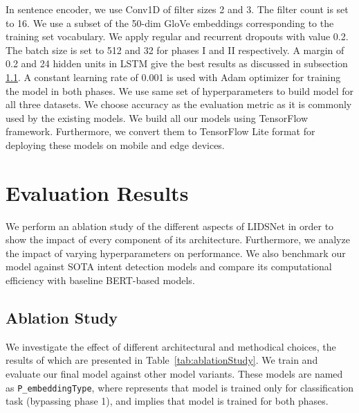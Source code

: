 \documentclass[conference]{IEEEtran}
\begin{document}
In sentence encoder, we use Conv1D of filter sizes 2 and 3. The filter count is set to 16. We use a subset of the 50-dim GloVe \cite{pennington-etal-2014-glove} embeddings corresponding to the training set vocabulary. We apply regular and recurrent dropouts with value 0.2. The batch size is set to 512 and 32 for phases I and II respectively. A margin of 0.2 and 24 hidden units in LSTM give the best results as discussed in subsection \ref{sec:ablationStudy}. A constant learning rate of 0.001 is used with Adam \cite{DBLP:journals/corr/KingmaB14} optimizer for training the model in both phases. We use same set of hyperparameters to build model for all three datasets. We choose accuracy as the evaluation metric as it is commonly used by the existing models. We build all our models using TensorFlow framework. Furthermore, we convert them to TensorFlow Lite format for deploying these models on mobile and edge devices.


\section{Evaluation Results}\label{sec:evaluationResults}

We perform an ablation study of the different aspects of LIDSNet in order to show the impact of every component of its architecture. Furthermore, we analyze the impact of varying hyperparameters on performance. We also benchmark our model against SOTA intent detection models and compare its computational efficiency with baseline BERT-based models.

\subsection{Ablation Study}\label{sec:ablationStudy}

We investigate the effect of different architectural and methodical choices, the results of which are presented in Table~\ref{tab:ablationStudy}. We train and evaluate our final model against other model variants. These models are named as \verb|P_embeddingType|, where  represents that model is trained only for classification task (bypassing phase 1), and  implies that model is trained for both phases.
\end{document}
